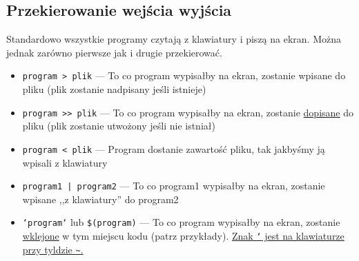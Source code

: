 \documentclass{instrukcja}
\begin{document}
\subsection{Przekierowanie wejścia wyjścia}
Standardowo wszystkie programy czytają z klawiatury i piszą na ekran. Można jednak zarówno pierwsze jak i drugie przekierować.
\begin{itemize}
\item {\tt {\red program} {\blue > plik}} --- To co program wypisałby na ekran, zostanie wpisane do {\blue plik}u ({\blue plik} zostanie nadpisany jeśli istnieje)
\item {\tt {\red program} {\blue >> plik}} --- To co program wypisałby na ekran, zostanie \uline{dopisane} do {\blue plik}u ({\blue plik} zostanie utwożony jeśli nie istniał)
\item {\tt {\red program} {\blue < plik}} --- Program dostanie zawartość {\blue plik}u, tak jakbyśmy ją wpisali z klawiatury
\item {\tt {\red program1} {\blue |} {\red program2}} --- To co {\red program1} wypisałby na ekran, zostanie wpisane ,,z klawiatury'' do {\red program2}
\item {\tt {\blue `}{\red program}{\blue `}} lub {\tt {\blue \$(}{\red program}{\blue )}} --- To co program wypisałby na ekran, zostanie \uline{wklejone} w tym miejscu kodu (patrz przykłady). \uline{Znak {\tt\blue `} jest na klawiaturze przy tyldzie {\tt\textasciitilde{}}.}
\end{itemize}
\end{document}
